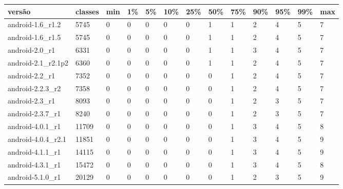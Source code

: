 \begin{tabular}{|l|l|l|l|l|l|l|l|l|l|l|l|l|}
\hline
versão&classes&min&1\%&5\%&10\%&25\%&50\%&75\%&90\%&95\%&99\%&max\\
\hline
android-1.6\_r1.2&5745&0&0&0&0&0&1&1&2&4&5&7\\
\hline
android-1.6\_r1.5&5745&0&0&0&0&0&1&1&2&4&5&7\\
\hline
android-2.0\_r1&6331&0&0&0&0&0&1&1&3&4&5&7\\
\hline
android-2.1\_r2.1p2&6360&0&0&0&0&0&1&1&2&4&5&7\\
\hline
android-2.2\_r1&7352&0&0&0&0&0&0&1&2&4&5&7\\
\hline
android-2.2.3\_r2&7358&0&0&0&0&0&0&1&2&4&5&7\\
\hline
android-2.3\_r1&8093&0&0&0&0&0&0&1&2&3&5&7\\
\hline
android-2.3.7\_r1&8240&0&0&0&0&0&0&1&2&3&5&7\\
\hline
android-4.0.1\_r1&11709&0&0&0&0&0&0&1&3&4&5&8\\
\hline
android-4.0.4\_r2.1&11851&0&0&0&0&0&0&1&3&4&5&9\\
\hline
android-4.1.1\_r1&14115&0&0&0&0&0&0&1&3&4&5&9\\
\hline
android-4.3.1\_r1&15472&0&0&0&0&0&0&1&3&4&5&8\\
\hline
android-5.1.0\_r1&20129&0&0&0&0&0&0&1&2&3&5&9\\
\hline
\end{tabular}
